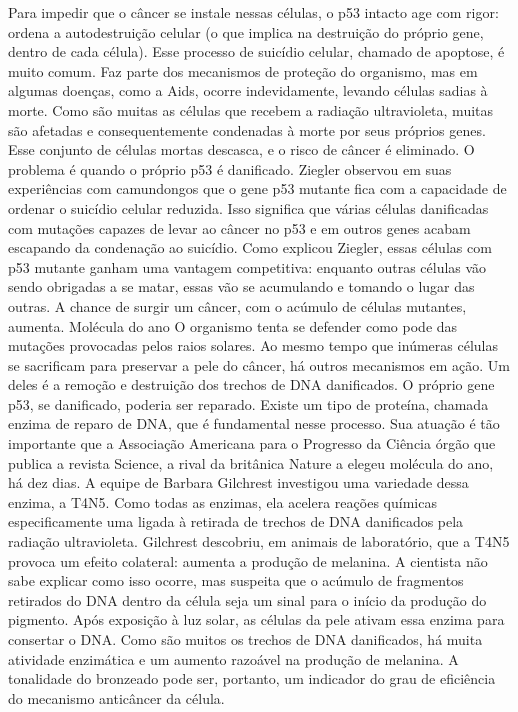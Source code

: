 Para impedir que o câncer se instale nessas células, o p53 intacto age com rigor: ordena a autodestruição celular (o que implica na destruição do próprio gene, dentro de cada célula).
Esse processo de suicídio celular, chamado de apoptose, é muito comum.
Faz parte dos mecanismos de proteção do organismo, mas em algumas doenças, como a Aids, ocorre indevidamente, levando células sadias à morte.
Como são muitas as células que recebem a radiação ultravioleta, muitas são afetadas e consequentemente condenadas à morte por seus próprios genes. Esse conjunto de células mortas descasca, e o risco de câncer é eliminado.
O problema é quando o próprio p53 é danificado. Ziegler observou em suas experiências com camundongos que o gene p53 mutante fica com a capacidade de ordenar o suicídio celular reduzida.
Isso significa que várias células danificadas com mutações capazes de levar ao câncer no p53 e em outros genes acabam escapando da  condenação ao suicídio.
Como explicou Ziegler, essas células com p53 mutante ganham uma vantagem competitiva: enquanto outras células vão sendo obrigadas a se matar, essas vão se acumulando e tomando o lugar das outras.
A chance de surgir um câncer, com o acúmulo de células mutantes, aumenta.
Molécula do ano 
O organismo tenta se defender como pode das mutações provocadas pelos raios solares.
Ao mesmo tempo que inúmeras células se sacrificam para preservar a pele do câncer, há outros mecanismos em ação.
Um deles é a remoção e destruição dos trechos de DNA danificados. O próprio gene p53, se danificado, poderia ser reparado.
Existe um tipo de proteína, chamada  enzima de reparo de DNA, que é fundamental nesse processo.
Sua atuação é tão importante que a Associação Americana para o Progresso da Ciência órgão que publica a revista  Science, a rival da britânica  Nature a elegeu  molécula do ano, há dez dias.
A equipe de Barbara Gilchrest investigou uma variedade dessa enzima, a T4N5.
Como todas as enzimas, ela acelera reações químicas especificamente uma ligada à retirada de trechos de DNA danificados pela radiação ultravioleta.
Gilchrest descobriu, em animais de laboratório, que a T4N5 provoca um  efeito colateral: aumenta a produção de melanina.
A cientista não sabe explicar como isso ocorre, mas suspeita que o acúmulo de fragmentos retirados do DNA dentro da célula seja um sinal para o início da produção do pigmento.
Após exposição à luz solar, as células da pele ativam essa enzima para consertar o DNA.
Como são muitos os trechos de DNA danificados, há muita atividade enzimática e um aumento razoável na produção de melanina.
A tonalidade do bronzeado pode ser, portanto, um indicador do grau de eficiência do mecanismo anticâncer da célula.
